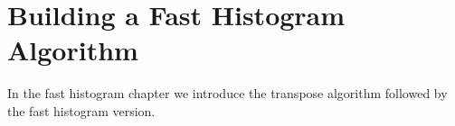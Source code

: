 \chapter{Building a Fast Histogram Algorithm}
\label{chap:fast histo}
In the fast histogram chapter we introduce the transpose algorithm followed by the fast histogram version.



